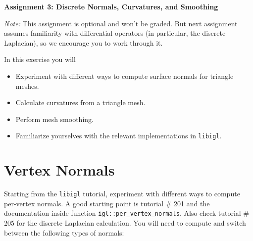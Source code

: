 \documentclass[11pt]{amsart}
\begin{document}
\hspace{50pt}

\begin{center}

{\huge \textbf{Assignment 3: Discrete Normals, Curvatures, and Smoothing}}\\
\vspace{10pt}
\end{center}

\emph{Note:} This assignment is optional and won't be graded. But next
assignment assumes familiarity with differential operators (in particular,
the discrete Laplacian), so we encourage you to work through it.

In this exercise you will
\begin{itemize}
\item{Experiment with different ways to compute surface normals for triangle meshes.}
\item{Calculate curvatures from a triangle mesh.}
\item{Perform mesh smoothing.}
\item{Familiarize yourselves with the relevant implementations in \texttt{libigl}.}
\end{itemize}

\section{Vertex Normals}
Starting from the \texttt{libigl} tutorial, experiment with different ways to
compute per-vertex normals. A good starting point is tutorial \# 201 and the
documentation inside function \texttt{igl::per\_vertex\_normals}. Also check
tutorial \# 205 for the discrete Laplacian calculation. You will need to compute
and switch between the following types of normals:
\end{document}
